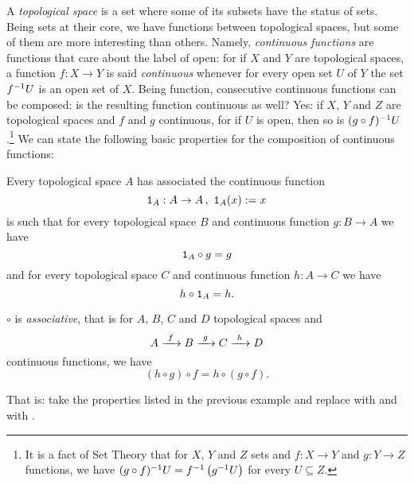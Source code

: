 \begin{example}[Topology]
  A {\em topological space} is a set where some of its subsets have
  the status of  sets. Being sets at their core, we have
  functions between topological spaces, but some of them are more
  interesting than others. Namely, {\em continuous functions} are
  functions that care about the label of open: for if \(X\) and \(Y\)
  are topological spaces, a function \(f : X \to Y\) is said {\em
    continuous} whenever for every open set \(U\) of \(Y\) the set
  \(f^{-1} U\) is an open set of \(X\). Being function, consecutive
  continuous functions can be composed: is the resulting function
  continuous as well? Yes: if \(X\), \(Y\) and \(Z\) are topological
  spaces and \(f\) and \(g\) continuous, for if \(U\) is open, then so
  is \((g \circ f)^{-1}U\).\footnote{It is a fact of Set Theory that
    for \(X\), \(Y\) and \(Z\) sets and \(f : X \to Y\) and
    \(g : Y \to Z\) functions, we have
    \((g \circ f)^{-1}U = f^{-1} \left(g^{-1} U\right)\) for every
    \(U \subseteq Z\).} We can state the following basic properties
  for the composition of continuous functions:
  \begin{tcbenum}
  \item Every topological space \(A\) has associated the continuous
    function
    \[\mathtt 1_A : A \to A \,,\ \mathtt 1_A (x) := x\]
    is such that for every topological space \(B\) and continuous
    function \(g : B \to A\) we have
    \[\mathtt 1_A \circ g = g\]
    and for every topological space \(C\) and continuous function
    \(h : A \to C\) we have
    \[h \circ \mathtt 1_A = h .\]
  \item \(\circ\) is {\em associative}, that is for \(A\), \(B\),
    \(C\) and \(D\) topological spaces and
    \[A \xrightarrow{\ f\ } B \xrightarrow{\ g\ } C \xrightarrow{\ h\ } D\] continuous functions,
    we have
    \[(h \circ g) \circ f = h \circ (g \circ f) .\]
  \end{tcbenum}
  That is: take the properties listed in the previous example and
  replace  with  and  with
  .
\end{example}

